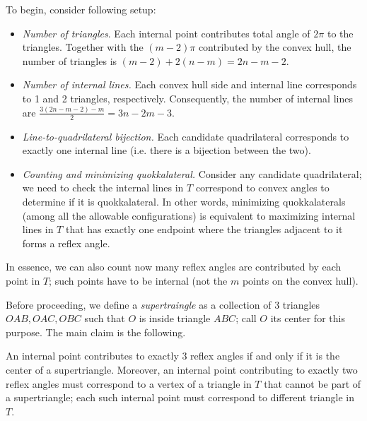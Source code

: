\documentclass[11pt,a4paper]{article}
\begin{document}
\begin{enumerate}
    	To begin, consider following setup: 
    	
    	\begin{itemize}
    		\item 
    		\textit{Number of triangles}. 
    		Each internal point contributes total angle of $2\pi$ to the triangles. Together with the $(m-2)\pi$ contributed by the convex hull, the number of triangles is $(m - 2) + 2(n - m) = 2n - m - 2$. 
    		
    		\item \textit{Number of internal lines.} Each convex hull side and internal line corresponds to 1 and 2 triangles, 
    		respectively. Consequently, the number of internal lines are 
    		$\frac{3(2n-m-2) - m}{2} = 3n - 2m - 3$. 
    		
    		\item \textit{Line-to-quadrilateral bijection.} 
    		Each candidate quadrilateral corresponds to exactly one internal line (i.e. there is a bijection between the two). 
    		
    		\item \textit{Counting and minimizing quokkalateral.} 
    		Consider any candidate quadrilateral; we need to check the internal lines in $T$ correspond to convex angles to determine if it is quokkalateral. 
    		In other words, minimizing quokkalaterals (among all the allowable configurations) is equivalent to maximizing internal lines in $T$ that has exactly one endpoint where the triangles adjacent to it forms a reflex angle. 
    	\end{itemize}
        In essence, we can also count now many reflex angles are contributed by each point in $T$; such points have to be internal (not the $m$ points on the convex hull). 
        
        Before proceeding, we define a \textit{supertraingle} as a collection of 3 triangles $OAB, OAC, OBC$ such that $O$ is inside triangle $ABC$; call $O$ its center for this purpose. The main claim is the following. 
        
        \begin{lemma}
        	An internal point contributes to exactly 3 reflex angles if and only if it is the center of a supertriangle. 
        	Moreover, an internal point contributing to exactly two reflex angles must correspond to a vertex of a triangle in $T$ that cannot be part of a supertriangle; 
        	each such internal point must correspond to different triangle in $T$. 
        \end{lemma}
        

\end{enumerate}
\end{document}

